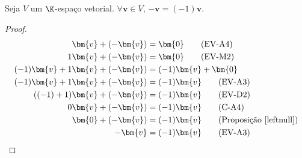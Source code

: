 \begin{proposition} \label{inverse} Seja $V$ um $\K$-espaço vetorial. $\forall \bm{v} \in V$, $-\bm{v} = (-1) \bm{v}$.
    \begin{proof}
        \begin{align*}
          \bm{v} + (-\bm{v}) &= \bm{0} \tag{EV-A4} \\
          1 \bm{v} + (-\bm{v}) &= \bm{0} \tag{EV-M2} \\
          (-1) \bm{v} + 1 \bm{v} + (-\bm{v}) &= (-1) \bm{v} + \bm{0}\\
          (-1) \bm{v} + 1 \bm{v} + (-\bm{v}) &= (-1) \bm{v} \tag{EV-A3}\\
          ((-1) + 1) \bm{v} + (-\bm{v}) &= (-1) \bm{v} \tag{EV-D2}\\
          0 \bm{v} + (-\bm{v}) &= (-1) \bm{v} \tag{C-A4}\\
          \bm{0} + (-\bm{v}) &= (-1) \bm{v} \tag{Proposição \ref{leftnull}}\\
          -\bm{v} &= (-1) \bm{v} \tag{EV-A3}
        \end{align*}
    \end{proof}
\end{proposition}